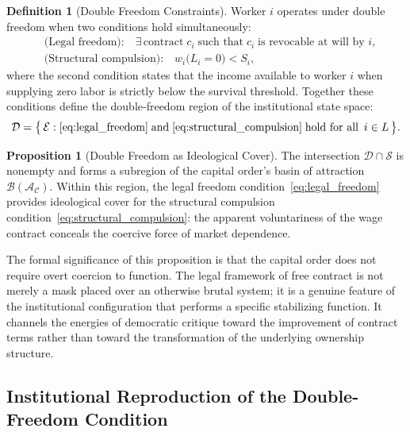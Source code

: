 \documentclass[12pt,a4paper]{article}
\theoremstyle{definition}
\newtheorem{definition}{Definition}[section]
\newtheorem{proposition}{Proposition}[section]
\theoremstyle{remark}
\begin{document}
\begin{definition}[Double Freedom Constraints]
Worker $i$ operates under double freedom when two conditions hold simultaneously:
\begin{align}
  \label{eq:legal_freedom}
  &\text{(Legal freedom):}\quad \exists\, \text{contract}\; c_i \;\text{such that}\; c_i \;\text{is revocable at will by } i, \\
  \label{eq:structural_compulsion}
  &\text{(Structural compulsion):}\quad w_i\bigl(L_i = 0\bigr) < S_i,
\end{align}
where the second condition states that the income available to worker $i$ when supplying zero labor is strictly below the survival threshold. Together these conditions define the double-freedom region of the institutional state space:
\begin{equation}
  \mathcal{D} = \bigl\{\, \mathcal{E} : \eqref{eq:legal_freedom} \;\text{and}\; \eqref{eq:structural_compulsion} \;\text{hold for all }\, i \in L \,\bigr\}.
\end{equation}
\end{definition}

\begin{proposition}[Double Freedom as Ideological Cover]
The intersection $\mathcal{D} \cap \mathcal{S}$ is nonempty and forms a subregion of the capital order's basin of attraction $\mathcal{B}(\mathcal{A}_\mathcal{C})$. Within this region, the legal freedom condition~\eqref{eq:legal_freedom} provides ideological cover for the structural compulsion condition~\eqref{eq:structural_compulsion}: the apparent voluntariness of the wage contract conceals the coercive force of market dependence.
\end{proposition}

The formal significance of this proposition is that the capital order does not require overt coercion to function. The legal framework of free contract is not merely a mask placed over an otherwise brutal system; it is a genuine feature of the institutional configuration that performs a specific stabilizing function. It channels the energies of democratic critique toward the improvement of contract terms rather than toward the transformation of the underlying ownership structure.

\subsection{Institutional Reproduction of the Double-Freedom Condition}
\end{document}
